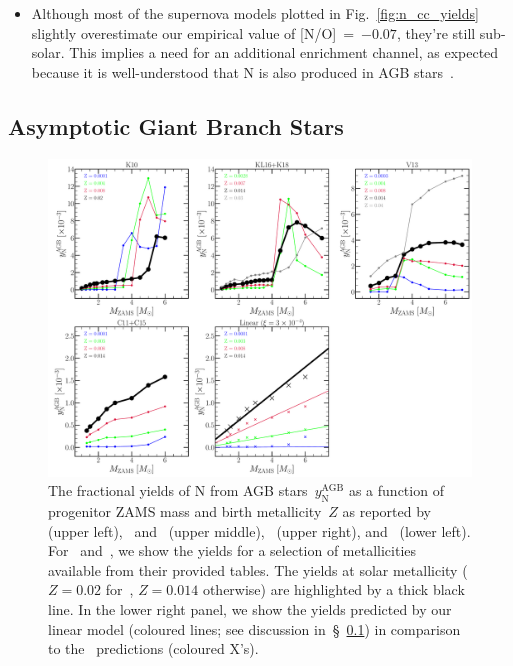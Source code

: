 \documentclass[ms.tex]{subfiles}
\begin{document}
\begin{itemize}
	\item Although most of the supernova models plotted in 
	Fig.~\ref{fig:n_cc_yields} slightly overestimate our empirical value of 
	[N/O]\subcc~=~$-0.07$, they're still sub-solar. 
	This implies a need for an additional enrichment channel, as expected 
	because it is well-understood that N is also produced in AGB 
	stars~\citep{Johnson2019}. 
\end{itemize} 

\subsection{Asymptotic Giant Branch Stars} 
\label{sec:yields:agb} 

\begin{figure} 
\centering 
\includegraphics[scale = 0.33]{agb_yield_models.pdf} 
\caption{
The fractional yields of N from AGB stars~$y_\text{N}^\text{AGB}$ as a function 
of progenitor ZAMS mass and birth metallicity~$Z$ as reported 
by~\citet{Karakas2010} (upper left),~\citet{Karakas2016} and~\citet{Karakas2018} 
(upper middle),~\citet{Ventura2013} (upper right), and~\citet{Cristallo2011, 
Cristallo2015} (lower left). 
For~\citet{Ventura2013} and~\citet{Cristallo2011, Cristallo2015}, we show the 
yields for a selection of metallicities available from their provided tables. 
The yields at solar metallicity ($Z = 0.02$ for~\citealt{Karakas2010}, 
$Z = 0.014$ otherwise) are highlighted by a thick black line. 
In the lower right panel, we show the yields predicted by our linear model 
(coloured lines; see discussion in~\S~\ref{sec:yields:agb}) in comparison to 
the~\citet{Cristallo2011, Cristallo2015} predictions (coloured X's). 
}
\label{fig:agb_yield_models} 
\end{figure} 
\end{document}
